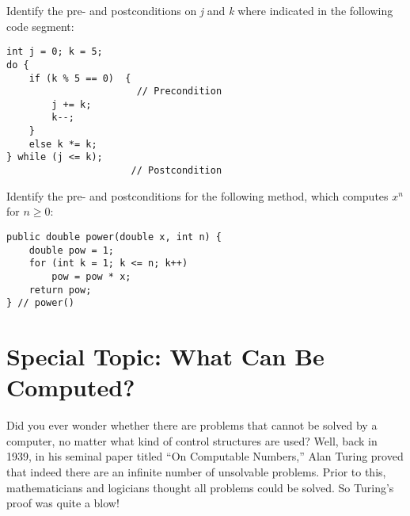 




\begin{SSTUDY}
\item  Identify the pre- and postconditions on {\it j} and {\it k}
where indicated in the following code segment:

\begin{jjjlisting}
\begin{lstlisting}
int j = 0; k = 5;
do {
    if (k % 5 == 0)  {
                       // Precondition
        j += k;
        k--;
    }
    else k *= k;
} while (j <= k);     
                      // Postcondition
\end{lstlisting}
\end{jjjlisting}

\item  Identify the pre- and postconditions for the following method, which
computes $x^n$ for  $n \geq 0$:

\begin{jjjlisting}
\begin{lstlisting}
public double power(double x, int n) {
    double pow = 1;
    for (int k = 1; k <= n; k++)
        pow = pow * x;
    return pow;
} // power()
\end{lstlisting}
\end{jjjlisting}

\end{SSTUDY}


\pagebreak
\section*{{\color{cyan}Special Topic:} What Can Be Computed?}
{Did you} ever wonder whether there are problems that cannot be solved
by a computer, no matter what kind of control structures are used?
Well, back in 1939, in his seminal paper titled ``On Computable
Numbers,'' Alan Turing proved that indeed there are an infinite number
of unsolvable problems. Prior to this, mathematicians and logicians
thought all problems could be solved. So Turing's proof was quite
a blow!

